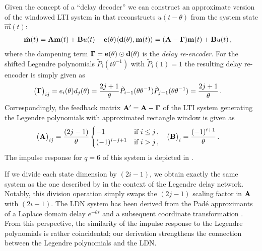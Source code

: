 Given the concept of a \enquote{delay decoder} we can construct an approximate version of the windowed LTI system in  that reconstructs $u(t - \theta)$ from the system state $\vec m(t)$:
\begin{align}
	\dot{\mathbf{m}}(t)
		&= \mathbf{A} \mathbf{m}(t) + \mathbf{B} u(t) - \mathbf{e}(\theta) \langle \mathbf{d}(\theta), \mathbf{m}(t) \rangle
		 = (\mathbf{A} - \mathbf{\Gamma}) \mathbf{m}(t) + \mathbf{B} u(t)
	\label{eqn:information_erasure_approx} \,,
\end{align}
where the dampening term $\mathbf{\Gamma} = \mathbf{e}(\theta) \odot \mathbf{d}(\theta)$ is the \emph{delay re-encoder}.
For the shifted Legendre polynomials $\tilde P_i(t \theta^{-1})$ with $\tilde P_i(1) = 1$ the resulting delay re-encoder is simply given as
\begin{align}
	\big( \mathbf{\Gamma} \big)_{ij} &= e_i(\theta) d_j(\theta) = \frac{2j + 1}{\theta} \tilde P_{i - 1}(\theta \theta^{-1}) \tilde P_{j - 1}(\theta \theta^{-1}) = \frac{2j + 1}{\theta} \,.
	\label{eqn:legendre_delay_reencoder}
\end{align}
Correspondingly, the feedback matrix $\mathbf{A}' = \mathbf{A} - \mathbf{\Gamma}$ of the LTI system generating the Legendre polynomials with approximated rectangle window is given as
\begin{align}
	\big( \mathbf{A} \big)_{ij} &= \frac{(2j - 1)}{\theta} \begin{cases}
		-1 & \text{if } i \leq j \,, \\
		(-1)^{i - j + 1} & \text{if } i > j  \,,\\
	\end{cases} &
	\big( \mathbf{B} \big)_i &= \frac{(-1)^{i + 1}}{\theta} \,.
	\label{eqn:ldn_system}
\end{align}
The impulse response for $q = 6$ of this system is depicted in .

If we divide each state dimension by $(2 i - 1)$, we obtain exactly the same system as the one described by \citet[Section 6.3.1, pp.~133-135]{voelker2019} in the context of the Legendre delay network.
Notably, this division operation simply swaps the $(2 j - 1)$ scaling factor in $\mathbf{A}$ with $(2 i - 1)$.
The LDN system has been derived from the Padé approximants of a Laplace domain delay $e^{-\theta s}$ and a subsequent coordinate transformation \citep{voelker2019}.
From this perspective, the similarity of the impulse response to the Legendre polynomials is rather coincidental; our derivation strengthens the connection between the Legendre polynomials and the LDN.


